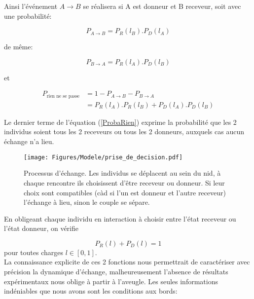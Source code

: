 Ainsi l'événement $A \rightarrow B$ se réalisera si A est donneur et B receveur, soit avec une probabilité:

\begin{equation}
P_{A \rightarrow B} = P_R(l_B) . P_D(l_A)
\label{ProbaAdonneB}
\end{equation}

de même:

\begin{equation}
P_{B \rightarrow A} = P_R(l_A) . P_D(l_B)
\label{ProbaBdonneA}
\end{equation}

et 

\begin{equation}
\begin{aligned}
P_{\text{rien ne se passe}} &= 1- P_{A \rightarrow B} - P_{B \rightarrow A}\\
&= P_R(l_A) . P_R(l_B) + P_D(l_A) . P_D(l_B)
\end{aligned}
\label{ProbaRien}
\end{equation}

Le dernier terme de l'équation (\ref{ProbaRien}) exprime la probabilité que les 2 individus soient tous les 2 receveurs ou tous les 2 donneurs, auxquels cas aucun échange n'a lieu.\\

\begin{figure}[h]
\centering
\texttt{[image: Figures/Modele/prise\_de\_decision.pdf]}
\caption{Processus d'échange. Les individus se déplacent au sein du nid, à chaque rencontre ils choisissent d'être receveur ou donneur. Si leur choix sont compatibles (càd si l'un est donneur et l'autre receveur) l'échange à lieu, sinon le couple se sépare.}
\label{echanges}
\end{figure}

En obligeant chaque individu en interaction à choisir entre l'état receveur ou l'état donneur, on vérifie

\begin{equation}
P_R(l)+P_D(l) = 1
\label{PRPD1}
\end{equation}
pour toutes charges $l\in[0,1]$.\\

La connaissance explicite de ces 2 fonctions nous permettrait de caractériser avec précision la dynamique d'échange, malheureusement l'absence de résultats expérimentaux nous oblige à partir à l'aveugle. Les seules informations indéniables que nous avons sont les conditions aux bords:

